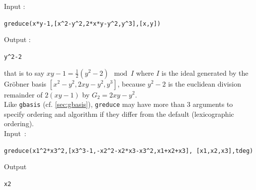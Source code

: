 \documentclass[a4paper,11pt]{book}
\begin{document}
Input :
\begin{center}{\tt greduce(x*y-1,[x\verb|^|2-y\verb|^|2,2*x*y-y\verb|^|2,y\verb|^|3],[x,y])}\end{center}
Output :
\begin{center}{\tt y\verb|^|2-2}\end{center}
that is to say $xy-1=\frac{1}{2}(y^2-2)\ \bmod I$ where $I$ is the ideal 
generated by the Gr\"obner basis $[x^2-y^2,2xy-y^2,y^3]$, because 
$ y^2-2$ is the euclidean division remainder of $2(xy-1)$ by $G_2=2x y-y^2$.\\

Like {\tt gbasis} (cf. \ref{sec:gbasis}),
{\tt greduce} may have more than 3 arguments to specify ordering and
algorithm if they differ from the default (lexicographic ordering).\\
Input~:
\begin{center}
{\tt greduce(x1\verb|^|2*x3\verb|^|2,[x3\verb|^|3-1,-x2\verb|^|2-x2*x3-x3\verb|^|2,x1+x2+x3], [x1,x2,x3],tdeg)}
\end{center}
Output
\begin{center}
\verb|x2|
\end{center}
\end{document}
